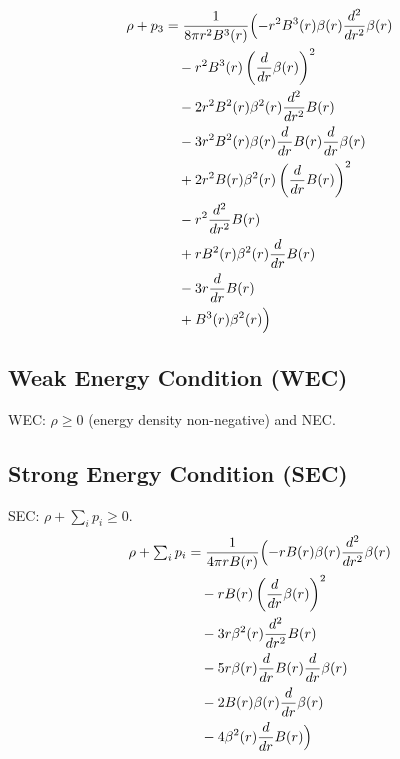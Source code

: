 \documentclass[11pt,a4paper]{article}
\begin{document}
\begin{align*}
  \rho + p_3 &= \frac{1}{8 \pi r^{2} B^{3}{\left(r \right)}}\Bigl(- r^{2} B^{3}{\left(r \right)} \beta{\left(r \right)} \frac{d^{2}}{d r^{2}} \beta{\left(r \right)} \\
  &\quad - r^{2} B^{3}{\left(r \right)} \left(\frac{d}{d r} \beta{\left(r \right)}\right)^{2} \\
  &\quad - 2 r^{2} B^{2}{\left(r \right)} \beta^{2}{\left(r \right)} \frac{d^{2}}{d r^{2}} B{\left(r \right)} \\
  &\quad - 3 r^{2} B^{2}{\left(r \right)} \beta{\left(r \right)} \frac{d}{d r} B{\left(r \right)} \frac{d}{d r} \beta{\left(r \right)} \\
  &\quad + 2 r^{2} B{\left(r \right)} \beta^{2}{\left(r \right)} \left(\frac{d}{d r} B{\left(r \right)}\right)^{2} \\
  &\quad - r^{2} \frac{d^{2}}{d r^{2}} B{\left(r \right)} \\
  &\quad + r B^{2}{\left(r \right)} \beta^{2}{\left(r \right)} \frac{d}{d r} B{\left(r \right)} \\
  &\quad - 3 r \frac{d}{d r} B{\left(r \right)} \\
  &\quad + B^{3}{\left(r \right)} \beta^{2}{\left(r \right)}\Bigr)
\end{align*}
\subsection{Weak Energy Condition (WEC)}
WEC: $\rho \geq 0$ (energy density non-negative) and NEC.
\subsection{Strong Energy Condition (SEC)}
SEC: $\rho + \sum_i p_i \geq 0$.
\begin{align*}
  \rho + \textstyle\sum_i p_i &= \frac{1}{4 \pi r B{\left(r \right)}}\Bigl(- r B{\left(r \right)} \beta{\left(r \right)} \frac{d^{2}}{d r^{2}} \beta{\left(r \right)} \\
  &\quad - r B{\left(r \right)} \left(\frac{d}{d r} \beta{\left(r \right)}\right)^{2} \\
  &\quad - 3 r \beta^{2}{\left(r \right)} \frac{d^{2}}{d r^{2}} B{\left(r \right)} \\
  &\quad - 5 r \beta{\left(r \right)} \frac{d}{d r} B{\left(r \right)} \frac{d}{d r} \beta{\left(r \right)} \\
  &\quad - 2 B{\left(r \right)} \beta{\left(r \right)} \frac{d}{d r} \beta{\left(r \right)} \\
  &\quad - 4 \beta^{2}{\left(r \right)} \frac{d}{d r} B{\left(r \right)}\Bigr)
\end{align*}
\end{document}
